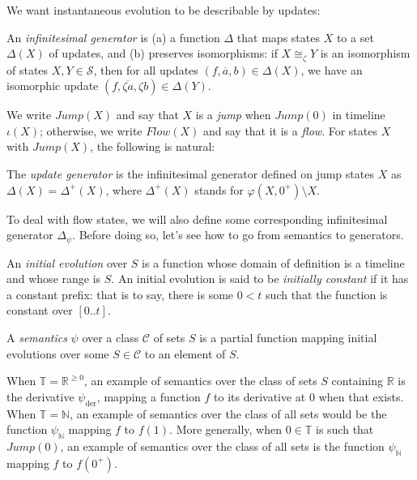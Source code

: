 \documentclass[envcountsame]{llncs}
\newcommand{\Continuous}[1]{\mathit{Flow}(#1)}   \newcommand{\notContinuous}[1]{\mathit{Jump}(#1)}   \newcommand{\Machine}{\textsc{Dynamic}}
\newcommand{\St}{\ensuremath{\mathcal {S}}}
\newcommand{\R}{\ensuremath{\mathbb{R}}}
\newcommand{\N}{\ensuremath{\mathbb{N}}}
\newcommand{\TT}{\ensuremath{\mathbb{T}}}
\newcommand{\update}[3]{(#1,#2,#3)}\spnewtheorem{postulate}{Postulate}{\bfseries}{\itshape}
\newcommand\Deltapsi{\Delta_\psi}
\newcommand{\itm}[1]{\mbox{\rm(}#1\mbox{\rm)}}
\newcommand{\nd}[1]{#1}\let\ep\endproof
\renewcommand{\endproof}{\qed\ep}
\begin{document}
We want instantaneous evolution to be describable by updates:


\begin{definition} \label{defmachin}
An \emph{infinitesimal generator}   is \itm{a} a function $\Delta$ that  maps states $X$ to a set $\Delta(X)$ of updates,
and \itm{b} preserves
  isomorphisms: if $X\cong_\zeta Y$ is an isomorphism of states
  $X,Y\in \St$, then for all updates
  $\update{f}{\overline{a}}{b} \in \Delta(X)$, we have an isomorphic update
  $\update{f}{\overline{\zeta a}}{\zeta b} \in \Delta(Y)$.
\end{definition}



\nd{We write $\notContinuous{X}$ and say that $X$ is a \emph{jump} when $\notContinuous{0}$  in
timeline
$\iota(X)$; otherwise, we write $\Continuous{X}$ and say that it is a \emph{flow}.}
For states $X$ with
$\notContinuous{X}$, the following is natural:


\begin{definition} \label{defupdate}
The \emph{update generator} is the infinitesimal generator defined on
jump states $X$ as
$\Delta(X)=\Delta^+(X)$, where $\Delta^+(X)$ stands for
$\varphi(X,0^+) \setminus X$.
\end{definition}


To deal with flow states, we will also define some corresponding infinitesimal
generator $\Deltapsi$. Before doing so, let's see  how to go from semantics to
generators.




An \emph{initial evolution} over $S$ is a function whose
domain of definition is a timeline and whose range is $S$. An initial evolution is said to be \emph{initially constant} if it has
a constant prefix: that is to say, there is some $0<t$ such that
the function is constant over $[0\mathbin{..}t]$.


\begin{definition}[Semantics]
A \emph{semantics} $\psi$ over a class $\mathcal{C}$ of sets $S$
is a partial function mapping
initial evolutions over some $S \in \mathcal{C}$
to an element of $S$.
\end{definition}

\begin{remark} \label{rq:ex}
When $\TT=\R^{\geq 0}$, an example of
semantics over the class of sets $S$ containing $\R$ is the derivative $\psi_{\textrm{der}}$, mapping a function
$f$ to its
derivative at $0$ when that exists. When $\TT=\N$, an example of
semantics over the class of all sets would be the function $\psi_\N$ mapping
$f$ to $f(1)$. More generally, when $0 \in \TT$ is such that $\notContinuous{0}$, an example of
semantics over the class of all sets is the function $\psi_\N$ mapping
$f$ to $f(0^+)$.
\end{remark}
\end{document}
